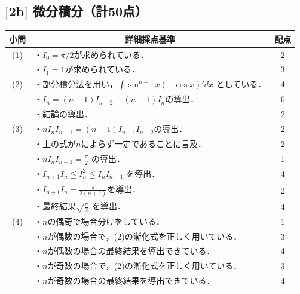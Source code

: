 \documentclass[dvipdfmx]{jlreq}
\theoremstyle{definition}
\begin{document}
\subsection*{[2b] 微分積分（計50点）}
\begin{longtable}{|c|p{11cm}|c|}
\hline
小問 & \multicolumn{1}{c|}{詳細採点基準} & 配点 \\ \hline
(1) & ・$I_0 = \pi/2$が求められている． & 2 \\
    & ・$I_1 = 1$が求められている． & 3 \\ \hline
(2) & ・部分積分法を用い，$\int \sin^{n-1}x (-\cos x)' dx$ としている． & 4 \\
    & ・$I_n=(n-1) I_{n-2} - (n-1) I_n$の導出． & 6 \\
    & ・結論の導出． & 2 \\ \hline
(3) & ・$nI_nI_{n-1} = (n-1)I_{n-1}I_{n-2}$の導出．& 2 \\
    & ・上の式が$n$によらず一定であることに言及． & 2 \\
    & ・$nI_nI_{n-1}=\frac{\pi}{2}$ の導出． & 1 \\
    & ・$I_{n+1} I_n \leqq I_n^2 \leqq I_n I_{n-1}$ を導出． & 4 \\
    & ・$I_{n+1}I_n = \frac{\pi}{2(n+1)}$を導出． & 2 \\
    & ・最終結果$\sqrt{\frac{\pi}{2}}$ を導出． & 4 \\ \hline
(4) & ・$n$の偶奇で場合分けをしている． & 1 \\
    & ・$n$が偶数の場合で，(2)の漸化式を正しく用いている．& 3 \\
    & ・$n$が偶数の場合の最終結果を導出できている． & 4 \\
    & ・$n$が奇数の場合で，(2)の漸化式を正しく用いている．& 3 \\
    & ・$n$が奇数の場合の最終結果を導出できている． & 4 \\ \hline
\end{longtable}
\end{document}
